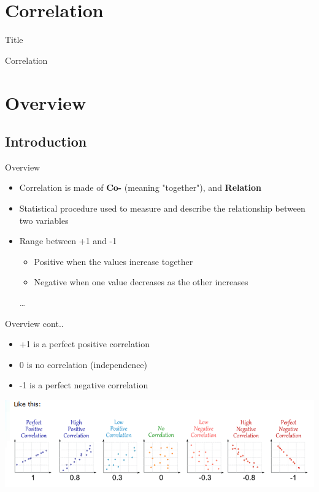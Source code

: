 \documentclass[slidestop,compress,14pt,xcolor=dvipsnames]{beamer}\usepackage[]{graphicx}\usepackage[]{color}
\author{Ken Mwai}
\institute{KEMRI-Wellcome}
\begin{document}
\section{Correlation}
\begin{frame}{Title}
\vspace*{\fill}
\begin{center}
Correlation
\end{center}
\vspace*{\fill}
\end{frame}

\section{Overview}
\subsection{Introduction}
\begin{frame}{Overview}
\begin{itemize}
    \item  Correlation is made of {\bf Co- } (meaning "together"), and {\bf Relation }
    \item Statistical procedure used to measure and describe the relationship between two variables 
    \item Range between +1 and -1
      \begin{itemize}
        \item Positive when the values increase together
        \item Negative when one value decreases as the other increases 
      \end{itemize}
\ldots
\end{itemize}
\end{frame}
\begin{frame}{Overview cont..}
\begin{itemize}
  \item +1 is a perfect positive correlation
  \item 0 is no correlation (independence)
  \item -1 is a perfect negative correlation
\end{itemize}
\includegraphics[scale=0.5]{corelation}
\end{frame}
\end{document}
